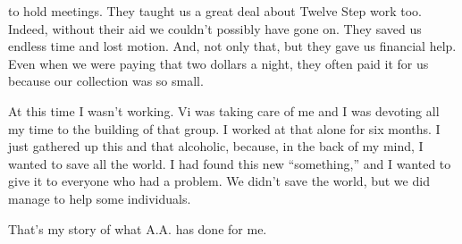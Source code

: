 \begin{biblechapter}
to hold meetings. They taught us a great deal about Twelve Step work too. Indeed, without their aid we couldn’t possibly have gone on. They saved us endless time and lost motion. And, not only that, but they gave us financial help. Even when we were paying that two dollars a night, they often paid it for us because our collection was so small.

At this time I wasn’t working. Vi was taking care of me and I was devoting all my time to the building of that group. I worked at that alone for six months. I just gathered up this and that alcoholic, because, in the back of my mind, I wanted to save all the world. I had found this new “something,” and I wanted to give it to everyone who had a problem. We didn’t save the world, but we did manage to help some individuals.

That’s my story of what A.A. has done for me.

\end{biblechapter}
